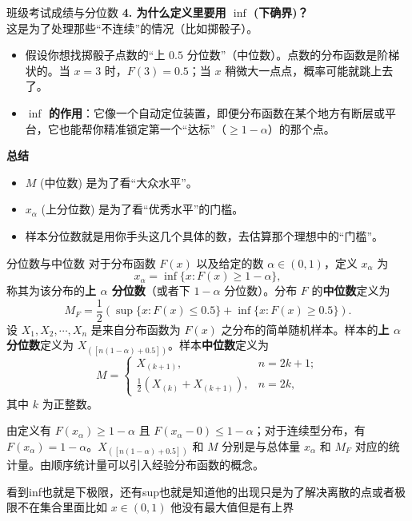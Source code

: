 \begin{example}{班级考试成绩与分位数}
\textbf{4. 为什么定义里要用 $\inf$ (下确界)？} \\
这是为了处理那些“不连续”的情况（比如掷骰子）。
\begin{itemize}
    \item 假设你想找掷骰子点数的“上 $0.5$ 分位数”（中位数）。点数的分布函数是阶梯状的。当 $x=3$ 时，$F(3)=0.5$；当 $x$ 稍微大一点点，概率可能就跳上去了。
    \item \textbf{$\inf$ 的作用}：它像一个自动定位装置，即便分布函数在某个地方有断层或平台，它也能帮你精准锁定第一个“达标”（$\geqslant 1-\alpha$）的那个点。
\end{itemize}

\textbf{总结} \\
\begin{itemize}
    \item $M$ (中位数) 是为了看“大众水平”。
    \item $x_\alpha$ (上分位数) 是为了看“优秀水平”的门槛。
    \item 样本分位数就是用你手头这几个具体的数，去估算那个理想中的“门槛”。
\end{itemize}
\end{example}
\begin{definition}{分位数与中位数}
    对于分布函数 $F(x)$ 以及给定的数 $\alpha \in (0,1)$，定义 $x_\alpha$ 为
    \[ x_\alpha = \inf\{x : F(x) \geqslant 1 - \alpha\}, \]
    称其为该分布的\textbf{上 $\alpha$ 分位数}（或者下 $1-\alpha$ 分位数）。分布 $F$ 的\textbf{中位数}定义为
    \[ M_F = \frac{1}{2}\left(\sup\{x : F(x) \leqslant 0.5\} + \inf\{x : F(x) \geqslant 0.5\}\right). \]
    设 $X_1, X_2, \cdots, X_n$ 是来自分布函数为 $F(x)$ 之分布的简单随机样本。样本的\textbf{上 $\alpha$ 分位数}定义为 $X_{([n(1-\alpha)+0.5])}$。样本\textbf{中位数}定义为
    \[ M = \begin{cases} 
        X_{(k+1)}, & n = 2k + 1; \\ 
        \frac{1}{2}(X_{(k)} + X_{(k+1)}), & n = 2k, 
    \end{cases} \]
    其中 $k$ 为正整数。

    由定义有 $F(x_\alpha) \geqslant 1 - \alpha$ 且 $F(x_\alpha - 0) \leqslant 1 - \alpha$；对于连续型分布，有 $F(x_\alpha) = 1 - \alpha$。$X_{([n(1-\alpha)+0.5])}$ 和 $M$ 分别是与总体量 $x_\alpha$ 和 $M_F$ 对应的统计量。由顺序统计量可以引入经验分布函数的概念。
\end{definition}
\begin{dxtips}
    看到inf也就是下极限，还有sup也就是知道他的出现只是为了解决离散的点或者极限不在集合里面比如 $x \in (0,1)$ 他没有最大值但是有上界
\end{dxtips}

